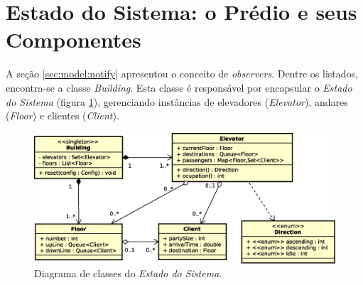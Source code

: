 \section{Estado do Sistema: o Prédio e seus Componentes}

A seção \ref{sec:model:notify} apresentou o conceito de \textit{observers}.
Dentre os listados, encontra-se a classe \textit{Building}. Esta classe é
responsável por encapsular o \textit{Estado do Sistema} (figura
\ref{fig:diagram:system}), gerenciando instâncias de elevadores
(\textit{Elevator}), andares (\textit{Floor}) e clientes (\textit{Client}).

\begin{figure}[htb!]
  \centering
  \includegraphics[scale=0.6]{img/Model.eps}
  \caption{Diagrama de classes do \textit{Estado do Sistema}.}
\label{fig:diagram:system}
\end{figure}

